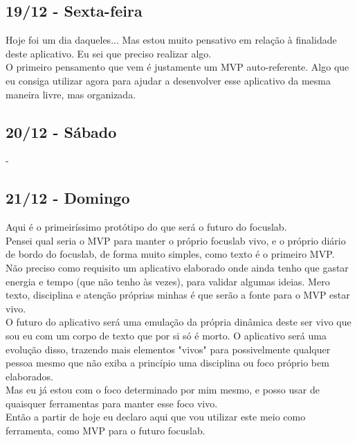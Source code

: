 \documentclass[11pt]{article}
\begin{document}
\subsection{19/12 - Sexta-feira}

Hoje foi um dia daqueles... Mas estou muito pensativo em relação à finalidade deste aplicativo. Eu sei que preciso realizar algo.\\

O primeiro pensamento que vem é justamente um MVP auto-referente. Algo que eu consiga utilizar agora para ajudar a desenvolver esse aplicativo da mesma maneira livre, mas organizada.

\subsection{20/12 - Sábado}

-

\subsection{21/12 - Domingo}

Aqui é o primeiríssimo protótipo do que será o futuro do focuslab. \\

Pensei qual seria o MVP para manter o próprio focuslab vivo, e o próprio diário de bordo do focuslab, de forma muito simples, como texto é o primeiro MVP.\\

Não preciso como requisito um aplicativo elaborado onde ainda tenho que gastar energia e tempo (que não tenho às vezes), para validar algumas ideias. Mero texto, disciplina e atenção próprias minhas é que serão a fonte para o MVP estar vivo.\\

O futuro do aplicativo será uma emulação da própria dinâmica deste ser vivo que sou eu com um corpo de texto que por si só é morto. O aplicativo será uma evolução disso, trazendo mais elementos "vivos" para possivelmente qualquer pessoa mesmo que não exiba a princípio uma disciplina ou foco próprio bem elaborados.\\

Mas eu já estou com o foco determinado por mim mesmo, e posso usar de quaisquer ferramentas para manter esse foco vivo. \\

Então a partir de hoje eu declaro aqui que vou utilizar este meio como ferramenta, como MVP para o futuro focuslab.\\
\end{document}
